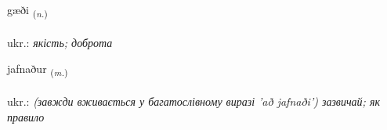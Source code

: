 \documentclass[frontgrid, backgrid]{flacards}\usepackage[]{graphicx}\usepackage[]{xcolor}
\begin{document}
\renewcommand{\flhead}{\vskip5pt \fboxsep=0pt {\small\bfseries\footnotesize Nafnorð | іменник}}
\renewcommand{\fcfoot}{\vskip5pt \fboxsep=0pt \hspace{2pt}{\small\bfseries\footnotesize 2K}}

\renewcommand{\blhead}{\vskip5pt {\small\bfseries\footnotesize Nafnorð | іменник }}
\renewcommand{\bcfoot}{\vskip5pt \hspace{2pt}{\small\bfseries\footnotesize 2K}}


{gæði \small{\textsubscript{(\textit{n.})}} \\[1ex] %
\textphonetic{[caiːðɪ]} \\
ukr.: \emph{якість; доброта} \\  [2ex]
\renewcommand*{\arraystretch}{0.8}
}

\renewcommand{\flhead}{\vskip5pt \fboxsep=0pt {\small\bfseries\footnotesize Nafnorð | іменник}}
\renewcommand{\fcfoot}{\vskip5pt \fboxsep=0pt \hspace{2pt}{\small\bfseries\footnotesize 2K}}

\renewcommand{\blhead}{\vskip5pt {\small\bfseries\footnotesize Nafnorð | іменник }}
\renewcommand{\bcfoot}{\vskip5pt \hspace{2pt}{\small\bfseries\footnotesize 2K}}


{jafnaður \small{\textsubscript{(\textit{m.})}} \\[1ex] %
\textphonetic{[japnaðʏr]} \\
ukr.: \emph{(завжди вживається у багатослівному виразі 'að jafnaði') зазвичай; як правило} \\  [2ex]
\renewcommand*{\arraystretch}{0.8}
}
\end{document}
